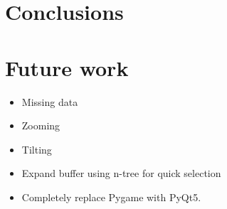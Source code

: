\chapter{Conclusions}
\label{ch:conclusion}
\chapter{Future work}
\begin{itemize}
  \item Missing data
  \item Zooming
  \item Tilting
  \item Expand buffer using n-tree for quick selection
  \item Completely replace Pygame with PyQt5.
\end{itemize}
